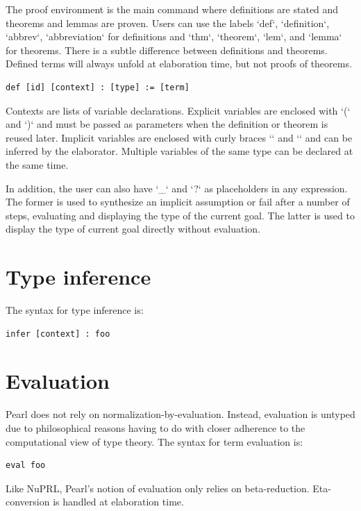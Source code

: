 \documentclass[a4paper]{article}
\begin{document}
The proof environment is the main command where definitions are stated and theorems and lemmas are proven. Users can use the labels `def`, `definition`, `abbrev`, `abbreviation` for definitions and `thm`, `theorem`, `lem`, and `lemma` for theorems. There is a subtle difference between definitions and theorems. Defined terms will always unfold at elaboration time, but not proofs of theorems. 


\begin{lstlisting}[style=pearl]
def [id] [context] : [type] := [term]
\end{lstlisting}


Contexts are lists of variable declarations. Explicit variables are enclosed with `(` and `)` and must be passed as parameters when the definition or theorem is reused later. Implicit variables are enclosed with curly braces `{` and `}` and can be inferred by the elaborator. Multiple variables of the same type can be declared at the same time.

In addition, the user can also have `\_` and `?` as placeholders in any expression. The former is used to synthesize an implicit assumption or fail after a number of steps, evaluating and displaying the type of the current goal. The latter is used to display the type of current goal directly without evaluation.

\section{Type inference}

The syntax for type inference is:

\begin{lstlisting}[style=pearl]
infer [context] : foo
\end{lstlisting}

\section{Evaluation}

Pearl does not rely on normalization-by-evaluation. Instead, evaluation is untyped due to philosophical reasons having to do with closer adherence to the computational view of type theory. The syntax for term evaluation is:

\begin{lstlisting}[style=pearl]
eval foo
\end{lstlisting}

Like NuPRL, Pearl's notion of evaluation only relies on beta-reduction. Eta-conversion is handled at elaboration time.
\end{document}
